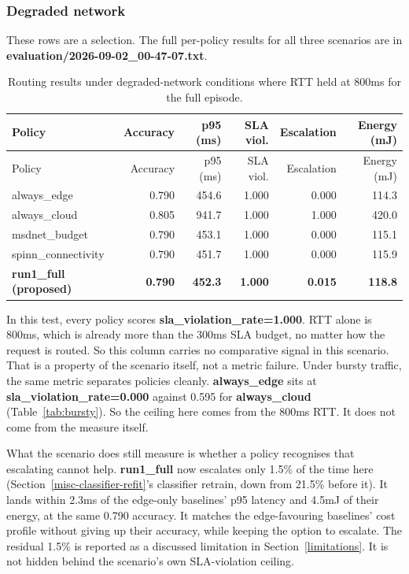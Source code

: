 \hypertarget{degraded-network}{%
\subsubsection{Degraded network}\label{degraded-network}}

These rows are a selection. The full per-policy results for all three scenarios are in \textbf{evaluation/2026-09-02\_00-47-07.txt}.

\begin{longtable}{lrrrrr}
\caption{Routing results under degraded-network conditions where RTT held at 800ms for the full episode.}\label{tab:degraded}\\
\toprule
Policy & Accuracy & p95 (ms) & SLA viol. & Escalation & Energy (mJ) \\
\midrule
\endfirsthead
\toprule
Policy & Accuracy & p95 (ms) & SLA viol. & Escalation & Energy (mJ) \\
\midrule
\endhead
always\_edge & 0.790 & 454.6 & 1.000 & 0.000 & 114.3 \\
always\_cloud & 0.805 & 941.7 & 1.000 & 1.000 & 420.0 \\
msdnet\_budget & 0.790 & 453.1 & 1.000 & 0.000 & 115.1 \\
spinn\_connectivity & 0.790 & 451.7 & 1.000 & 0.000 & 115.9 \\
\textbf{run1\_full (proposed)} & \textbf{0.790} & \textbf{452.3} & \textbf{1.000} & \textbf{0.015} & \textbf{118.8} \\
\bottomrule
\end{longtable}

In this test, every policy scores \textbf{sla\_violation\_rate=1.000}.
RTT alone is 800ms, which is already more than the 300ms SLA budget, no matter how the request is routed. So this column carries no comparative
signal in this scenario. That is a property of the scenario itself,
not a metric failure. Under bursty traffic, the same metric separates
policies cleanly. \textbf{always\_edge} sits at
\textbf{sla\_violation\_rate=0.000} against 0.595 for
\textbf{always\_cloud} (Table~\ref{tab:bursty}). So the ceiling here comes
from the 800ms RTT. It does not come from the measure itself.

What the scenario does still measure is whether a policy recognises
that escalating cannot help. \textbf{run1\_full} now escalates only
1.5\% of the time here (Section~\ref{misc-classifier-refit}'s classifier retrain, down from
21.5\% before it). It lands within 2.3ms of the edge-only baselines' p95
latency and 4.5mJ of their energy, at the same 0.790 accuracy. It
matches the edge-favouring baselines' cost profile without giving up
their accuracy, while keeping the option to escalate.
The residual 1.5\% is reported as a discussed limitation in Section~\ref{limitations}. It is not hidden behind the scenario's own SLA-violation ceiling.

